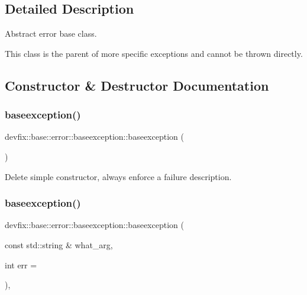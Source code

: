 \subsection{Detailed Description}
Abstract error base class. 

This class is the parent of more specific exceptions and cannot be thrown directly. 

\subsection{Constructor \& Destructor Documentation}
\mbox{\label{structdevfix_1_1base_1_1error_1_1baseexception_abc1384f68bf47292ab520a96eedec596}} 
\subsubsection{\texorpdfstring{baseexception()}{baseexception()}\hspace{0.1cm}{\footnotesize\ttfamily [1/2]}}
{\footnotesize\ttfamily devfix\+::base\+::error\+::baseexception\+::baseexception (\begin{DoxyParamCaption}{ }\end{DoxyParamCaption})\hspace{0.3cm}{\ttfamily [delete]}}

Delete simple constructor, always enforce a failure description. \mbox{\label{structdevfix_1_1base_1_1error_1_1baseexception_ad2b9d2672d0a946cabc16bf26be3fe2e}} 
\subsubsection{\texorpdfstring{baseexception()}{baseexception()}\hspace{0.1cm}{\footnotesize\ttfamily [2/2]}}
{\footnotesize\ttfamily devfix\+::base\+::error\+::baseexception\+::baseexception (\begin{DoxyParamCaption}\item[{const std\+::string \&}]{what\+\_\+arg,  }\item[{int}]{err = {} }\end{DoxyParamCaption})\hspace{0.3cm}{\ttfamily [inline]}, {\ttfamily [explicit]}}

